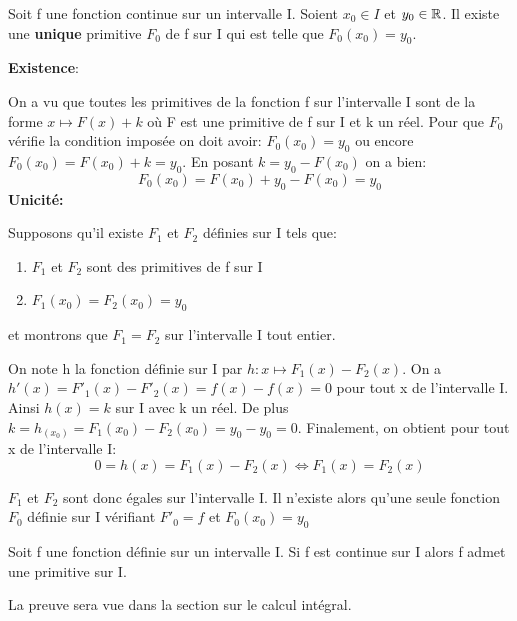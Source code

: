 \begin{theo}
  Soit f une fonction continue sur un intervalle I. Soient $x_0 \in I$
  et $y_0 \in \mathbb{R}$. Il existe une \textbf{unique} primitive $F_0$ de f sur I
  qui est telle que $F_0(x_0) = y_0$. 
\end{theo}

\begin{Proof}
  \textbf{Existence}:

  On a vu que toutes les primitives de la fonction f sur l'intervalle
  I sont de la forme $x \mapsto F(x) + k$ où F est une primitive de f
  sur I et k un réel. Pour que $F_0$ vérifie la condition imposée on
  doit avoir: $F_0(x_0) = y_0$ ou encore $F_0(x_0) = F(x_0) + k =
  y_0$. En posant $k = y_0 - F(x_0)$ on a bien:
  \[
    F_0(x_0) = F(x_0) + y_0 - F(x_0) = y_0
  \]
  \newline
  \textbf{Unicité: }

  Supposons qu'il existe $F_1$ et $F_2$ définies sur I tels que:
  \begin{enumerate}[label = (\arabic*),leftmargin=2cm]
  \item $F_1$ et $F_2$ sont des primitives de f sur I
  \item $F_1(x_0) = F_2(x_0) = y_0$
  \end{enumerate}
  et montrons que $F_1 = F_2$ sur l'intervalle I tout entier.

  On note h la fonction définie sur I par $h: x \mapsto F_1(x) -
  F_2(x)$. On a $h'(x) = F'_1(x) - F'_2(x) = f(x) - f(x) = 0$ pour
  tout x de l'intervalle I. Ainsi $h(x) = k$ sur I avec k un réel. De
  plus $k = h_(x_0) = F_1(x_0) - F_2(x_0) = y_0 - y_0 =
  0$. Finalement, on obtient pour tout x de l'intervalle I:
  \[
    0 = h(x) = F_1(x) - F_2(x) \Leftrightarrow  F_1(x) = F_2(x)
  \]

  $F_1$ et $F_2$ sont donc égales sur l'intervalle I. Il n'existe
  alors qu'une seule fonction $F_0$ définie sur I vérifiant $F'_0 = f$ et $F_0(x_0) = y_0$
\end{Proof}

\begin{prop}
  Soit f une fonction définie sur un intervalle I.
  Si f est continue sur I alors f admet une primitive sur I.
\end{prop}

\begin{Proof}
  La preuve sera vue dans la section sur le calcul intégral.
\end{Proof}

